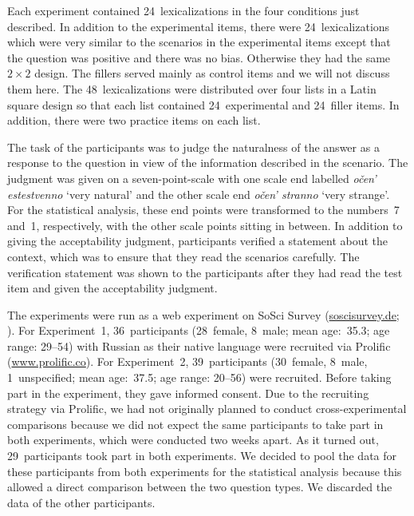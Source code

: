 \documentclass[output=paper,colorlinks,citecolor=brown]{langscibook}
\begin{document}
\noindent Each experiment contained 24~lexicalizations in the four conditions just described. In addition to the experimental items, there were 24~lexicalizations which were very similar to the scenarios in the experimental items except that the question was positive and there was no bias. Otherwise they had the same $2\times2$ design. The fillers served mainly as control items and we will not discuss them here. The 48~lexicalizations were distributed over four lists in a Latin square design so that each list contained 24~experimental and 24~filler items. In addition, there were two practice items on each list.

The task of the participants was to judge the naturalness of the answer as a response to the question in view of the information described in the scenario. The judgment was given on a seven-point-scale with one scale end labelled \textit{očen’ estestvenno} ‘very natural’ and the other scale end \textit{očen’ stranno} ‘very strange’. For the statistical analysis, these end points were transformed to the numbers~7 and~1, respectively, with the other scale points sitting in between. In addition to giving the acceptability judgment, participants verified a statement about the context, which was to ensure that they read the scenarios carefully. The verification statement was shown to the participants after they had read the test item and given the acceptability judgment.

The experiments were run as a web experiment on SoSci Survey (\url{soscisurvey.de}; \citealt{Leiner2021}). For Experiment~1, 36~participants (28~female, 8~male; mean age:~35.3; age range: 29--54) with Russian as their native language were recruited via Prolific (\url{www.prolific.co}). For Experiment~2, 39~participants (30~female, 8~male, 1~unspecified; mean age:~37.5; age range: 20--56) were recruited. Before taking part in the experiment, they gave informed consent. Due to the recruiting strategy via Prolific, we had not originally planned to conduct cross-experimental comparisons because we did not expect the same participants to take part in both experiments, which were conducted two weeks apart. As it turned out, 29~participants took part in both experiments. We decided to pool the data for these participants from both experiments for the statistical analysis because this allowed a direct comparison between the two question types. We discarded the data of the other participants. 
\end{document}
